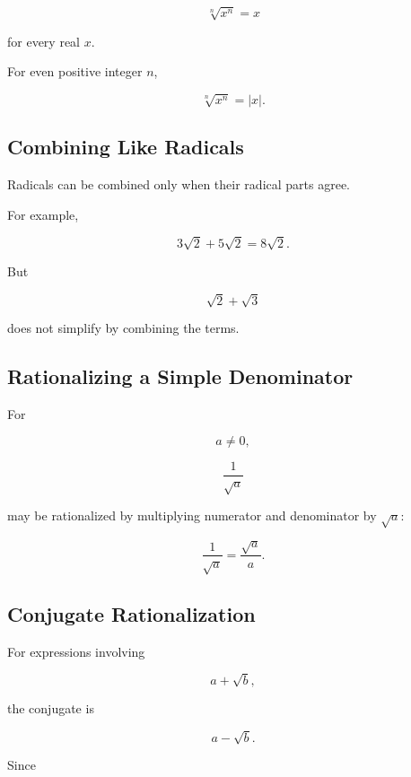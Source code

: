 \[
\boxed{
\sqrt[n]{x^n}=x
}
\]

for every real \(x\).

For even positive integer \(n\),

\[
\boxed{
\sqrt[n]{x^n}
=
|x|.
}
\]

\subsection{Combining Like Radicals}
\label{subsec:combining-like-radicals}

Radicals can be combined only when their radical parts agree.

For example,

\[
\boxed{
3\sqrt2+5\sqrt2
=
8\sqrt2.
}
\]

But

\[
\boxed{
\sqrt2+\sqrt3
}
\]

does not simplify by combining the terms.

\subsection{Rationalizing a Simple Denominator}
\label{subsec:rationalizing-simple-denominator}

For

\[
a\neq0,
\]

\[
\frac{1}{\sqrt a}
\]

may be rationalized by multiplying numerator and denominator by \(\sqrt a\):

\[
\boxed{
\frac{1}{\sqrt a}
=
\frac{\sqrt a}{a}.
}
\]

\subsection{Conjugate Rationalization}
\label{subsec:conjugate-rationalization}

For expressions involving

\[
a+\sqrt b,
\]

the conjugate is

\[
\boxed{
a-\sqrt b.
}
\]

Since

